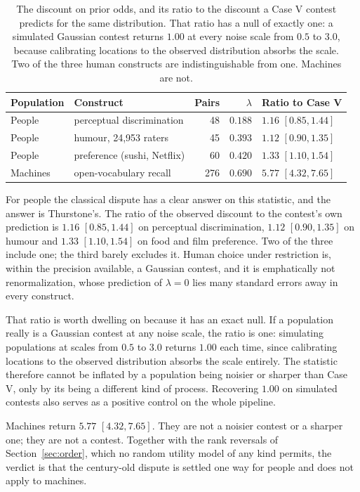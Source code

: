 \documentclass[11pt]{article}
\begin{document}
\begin{table}[ht]
\centering
\small
\begin{tabular}{llrrl}
\toprule
Population & Construct & Pairs & $\lambda$ & Ratio to Case V \\
\midrule
People & perceptual discrimination & 48 & $0.188$ & $1.16$ $[0.85, 1.44]$ \\
People & humour, 24{,}953 raters & 45 & $0.393$ & $1.12$ $[0.90, 1.35]$ \\
People & preference (sushi, Netflix) & 60 & $0.420$ & $1.33$ $[1.10, 1.54]$ \\
\midrule
Machines & open-vocabulary recall & 276 & $0.690$ & $\mathbf{5.77}$ $[4.32, 7.65]$ \\
\bottomrule
\end{tabular}
\caption{The discount on prior odds, and its ratio to the discount a Case V
contest predicts for the same distribution. That ratio has a null of exactly
one: a simulated Gaussian contest returns $1.00$ at every noise scale from
$0.5$ to $3.0$, because calibrating locations to the observed distribution
absorbs the scale. Two of the three human constructs are indistinguishable from
one. Machines are not.}
\label{tab:construct}
\end{table}

For people the classical dispute has a clear answer on this statistic, and the
answer is Thurstone's. The ratio of the observed discount to the contest's own
prediction is $1.16$ $[0.85, 1.44]$ on perceptual discrimination, $1.12$
$[0.90, 1.35]$ on humour and $1.33$ $[1.10, 1.54]$ on food and film preference.
Two of the three include one; the third barely excludes it. Human choice under
restriction is, within the precision available, a Gaussian contest, and it is
emphatically not renormalization, whose prediction of $\lambda = 0$ lies many
standard errors away in every construct.

That ratio is worth dwelling on because it has an exact null. If a population
really is a Gaussian contest at any noise scale, the ratio is one: simulating
populations at scales from $0.5$ to $3.0$ returns $1.00$ each time, since
calibrating locations to the observed distribution absorbs the scale entirely.
The statistic therefore cannot be inflated by a population being noisier or
sharper than Case V, only by its being a different kind of process. Recovering
$1.00$ on simulated contests also serves as a positive control on the whole
pipeline.

Machines return $5.77$ $[4.32, 7.65]$. They are not a noisier contest or a
sharper one; they are not a contest. Together with the rank reversals of
Section~\ref{sec:order}, which no random utility model of any kind permits, the
verdict is that the century-old dispute is settled one way for people and does
not apply to machines.
\end{document}
